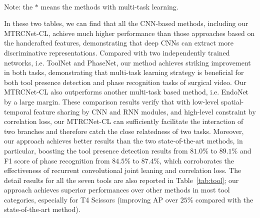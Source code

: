 \documentclass{elsarticle}
\begin{document}
	\begin{table}[t]
\centering
		\caption{Phase recognition results using different approaches (rows).}
		\vspace{-3mm}
		\label{tab:phase}
			\\
			\vspace{0.5mm}
			\scriptsize Note: the $\ast$ means the methods with multi-task learning. ~~~~~~~~~~~~~~~~~~~~							
\end{table}
		
		
		
		In these two tables, we can find that all the CNN-based methods, including our MTRCNet-CL, achieve much higher performance than those approaches based on the handcrafted features, demonstrating that deep CNNs can extract more discriminative representations.
		Compared with two independently trained networks, i.e. ToolNet and PhaseNet, our method achieves striking improvement in both tasks, demonstrating that multi-task learning strategy is beneficial for both tool presence detection and phase recognition tasks of surgical video.
		Our MTRCNet-CL also outperforms another multi-task based method, i.e. EndoNet by a large margin.
		These comparison results verify that with low-level spatial-temporal feature sharing by CNN and RNN modules, and high-level constraint by correlation loss, 
		our MTRCNet-CL can sufficiently facilitate the interaction of two branches and therefore catch the close relatedness of two tasks.
		Moreover, our approach achieves better results than the two state-of-the-art methods, in particular, boosting the tool presence detection results from $81.0\%$ to $89.1\%$ and F1 score of phase recognition from $84.5\%$ to $87.4\%$, which corroborates the effectiveness of recurrent convolutional joint leaning and correlation loss.
		The detail results for all the seven tools are also reported in Table~\ref{tab:tool}; our approach achieves superior performances over other methods in most tool categories, especially for T4 Scissors (improving AP over $25\%$ compared with the state-of-the-art method).
		
\end{document}
